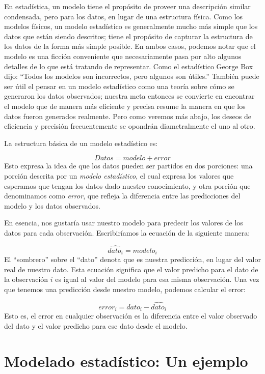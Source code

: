 \documentclass[
  12pt,
]{book}
\begin{document}
En estadística, un modelo tiene el propósito de proveer una descripción similar condensada, pero para los datos, en lugar de una estructura física. Como los modelos físicos, un modelo estadístico es generalmente mucho más simple que los datos que están siendo descritos; tiene el propósito de capturar la estructura de los datos de la forma más simple posible. En ambos casos, podemos notar que el modelo es una ficción conveniente que necesariamente pasa por alto algunos detalles de lo que está tratando de representar. Como el estadístico George Box dijo: ``Todos los modelos son incorrectos, pero algunos son útiles.'' También puede ser útil el pensar en un modelo estadístico como una teoría sobre cómo se generaron los datos observados; nuestra meta entonces se convierte en encontrar el modelo que de manera más eficiente y precisa resume la manera en que los datos fueron generados realmente. Pero como veremos más abajo, los deseos de eficiencia y precisión frecuentemente se opondrán diametralmente el uno al otro.

La estructura básica de un modelo estadístico es:

\[
Datos= modelo + error
\]
Esto expresa la idea de que los datos pueden ser partidos en dos porciones: una porción descrita por un \emph{modelo estadístico}, el cual expresa los valores que esperamos que tengan los datos dado nuestro conocimiento, y otra porción que denominamos como \emph{error}, que refleja la diferencia entre las predicciones del modelo y los datos observados.

En esencia, nos gustaría usar nuestro modelo para predecir los valores de los datos para cada observación. Escribiríamos la ecuación de la siguiente manera:

\[
\widehat{dato_i} = modelo_i
\]
El ``sombrero'' sobre el ``dato'' denota que es nuestra predicción, en lugar del valor real de nuestro dato. Esta ecuación significa que el valor predicho para el dato de la observación \(i\) es igual al valor del modelo para esa misma observación. Una vez que tenemos una predicción desde nuestro modelo, podemos calcular el error:

\[
error_i = dato_i - \widehat{dato_i}
\]
Esto es, el error en cualquier observación es la diferencia entre el valor observado del dato y el valor predicho para ese dato desde el modelo.

\hypertarget{modelado-estaduxedstico-un-ejemplo}{%
\section{Modelado estadístico: Un ejemplo}\label{modelado-estaduxedstico-un-ejemplo}}
\end{document}
